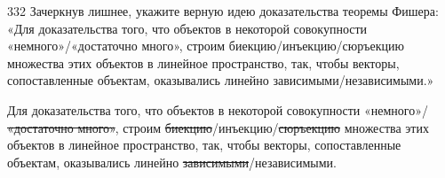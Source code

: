\begin{task}{332}
Зачеркнув лишнее, укажите верную идею доказательства теоремы Фишера: «Для доказательства того, что объектов в некоторой совокупности «немного»/«достаточно много», строим биекцию/инъекцию/сюръекцию множества этих объектов в линейное пространство, так, чтобы векторы, сопоставленные объектам, оказывались линейно зависимыми/независимыми.»
\end{task}

\begin{solution}
Для доказательства того, что объектов в некоторой совокупности «немного»/ \sout{«достаточно много»}, строим \sout{биекцию}/инъекцию/\sout{сюръекцию} множества этих объектов в линейное пространство, так, чтобы векторы, сопоставленные объектам, оказывались линейно \sout{зависимыми}/независимыми.
\end{solution}